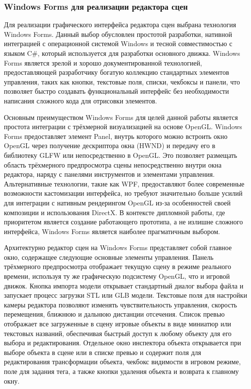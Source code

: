 \subsubsection{Windows Forms для реализации редактора сцен}
Для реализации графического интерфейса редактора сцен выбрана технология Windows Forms. Данный выбор обусловлен простотой разработки, нативной интеграцией с операционной системой Windows и тесной совместимостью с языком C\#, который используется для разработки основного движка. Windows Forms является зрелой и хорошо документированной технологией, предоставляющей разработчику богатую коллекцию стандартных элементов управления, таких как кнопки, текстовые поля, списки, чекбоксы и панели, что позволяет быстро создавать функциональный интерфейс без необходимости написания сложного кода для отрисовки элементов.

Основным преимуществом Windows Forms для целей данной работы является простота интеграции с трёхмерной визуализацией на основе OpenGL. Windows Forms предоставляет элемент Panel, внутрь которого можно встроить окно OpenGL через получение дескриптора окна (HWND) и передачу его в библиотеку GLFW или непосредственно в OpenGL. Это позволяет размещать область трёхмерного предпросмотра сцены непосредственно внутри окна редактора, наряду с панелями инструментов и элементами управления. Альтернативные технологии, такие как WPF, предоставляют более современные возможности кастомизации интерфейса, но требуют значительно больше усилий для интеграции с нативным рендерингом OpenGL из-за особенностей своей композиции и использования DirectX. В контексте дипломной работы, где приоритетом является создание работающего прототипа, а не излишне сложного интерфейса, Windows Forms является наиболее прагматичным выбором.

Архитектурно редактор сцен на Windows Forms представляет собой главное окно, содержащее следующие основные элементы управления. Панель трёхмерного предпросмотра отображает текущую сцену в режиме реального времени, используя ту же графическую подсистему OpenGL, что и игровой движок. Кнопка импорта модели открывает стандартный диалог выбора файла и запускает процесс загрузки STL или GLB модели. Текстовые поля для настройки камеры редактора позволяют изменять чувствительность управления, скорость перемещения, ближнюю и дальнюю дистанции отсечения. Список превью отображает все загруженные в сцену игровые объекты в виде миниатюр или текстовых названий, обеспечивая быстрый доступ к любому объекту для его выбора и редактирования. Отдельное окно инспектора объекта открывается при выборе объекта в сцене или в списке превью и содержит поля для редактирования трансформации объекта, чекбокс видимости в игровом режиме, поле для задания тега, а также кнопки удаления объекта и возврата к главному окну.

